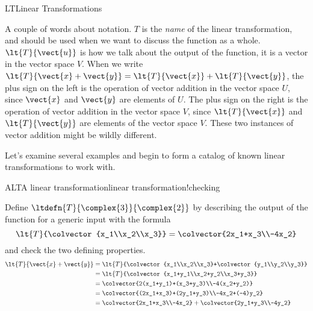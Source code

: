\begin{subsect}{LT}{Linear Transformations}
\begin{para}
\end{para}
%
\begin{para}A couple of words about notation.  $T$ is the {\em name} of the linear transformation, and should be used when we want to discuss the function as a whole.  $\lt{T}{\vect{u}}$ is how we talk about the output of the function, it is a vector in the vector space $V$.  When we write $\lt{T}{\vect{x}+\vect{y}}=\lt{T}{\vect{x}}+\lt{T}{\vect{y}}$, the plus sign on the left is the operation of vector addition in the vector space $U$, since $\vect{x}$ and $\vect{y}$ are elements of $U$.  The plus sign on the right is the operation of vector addition in the vector space $V$, since $\lt{T}{\vect{x}}$ and $\lt{T}{\vect{y}}$ are elements of the vector space $V$.  These two instances of vector addition might be wildly different.\end{para}
%
\begin{para}Let's examine several examples and begin to form a catalog of known linear transformations to work with.\end{para}
%
\begin{example}{ALT}{A linear transformation}{linear transformation!checking}
\begin{para}Define $\ltdefn{T}{\complex{3}}{\complex{2}}$ by describing the output of the function for a generic input with the formula
%
\begin{equation*}
\lt{T}{\colvector{x_1\\x_2\\x_3}}=\colvector{2x_1+x_3\\-4x_2}
\end{equation*}
%
and check the two defining properties.
\begin{align*}
\lt{T}{\vect{x}+\vect{y}}
&=\lt{T}{\colvector{x_1\\x_2\\x_3}+\colvector{y_1\\y_2\\y_3}}\\
&=\lt{T}{\colvector{x_1+y_1\\x_2+y_2\\x_3+y_3}}\\
&=\colvector{2(x_1+y_1)+(x_3+y_3)\\-4(x_2+y_2)}\\
&=\colvector{(2x_1+x_3)+(2y_1+y_3)\\-4x_2+(-4)y_2}\\
&=\colvector{2x_1+x_3\\-4x_2}+\colvector{2y_1+y_3\\-4y_2}\\

\end{align*}
\end{para}
\end{example}
\end{subsect}
